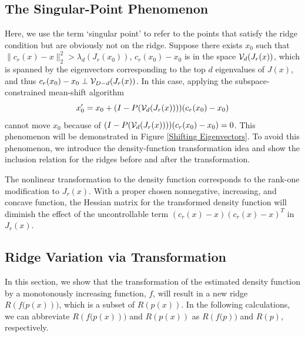 \documentclass[aos,preprint]{imsart}
\theoremstyle{remark}
\begin{document}
\subsection{The Singular-Point Phenomenon}
Here, we use the term `singular point' to refer to the points that satisfy the ridge condition but are obviously not on the ridge.
Suppose there exists $x_0$ such that $\|c_r(x)-x\|_2^2>\lambda_d(J_r(x_0))$, $c_r(x_0)-x_0$ is in the space ${\cal V}_d(J_r(x))$, which is spanned by the eigenvectors corresponding to the top $d$ eigenvalues of $J(x)$, and thus $c_r(x_0)-x_0\perp {\cal V}_{D-d}(J_r(x))$. In this case, applying the subspace-constrained mean-shift algorithm 
\[
x_0' = x_0+ (I-P({\cal V}_d(J_r(x)))) (c_r(x_0)-x_0)
\] 
cannot move $x_0$ because of $(I- P({\cal V}_d(J_r(x)))) (c_r(x_0)-x_0)=0$. This phenomenon will be demonstrated in Figure \ref{Shifting Eigenvectors}. To avoid this phenomenon, we introduce the density-function transformation idea and show the inclusion relation for the ridges before and after the transformation.

The nonlinear transformation to the density function corresponds to the rank-one modification to $J_r(x)$. With a proper chosen nonnegative, increasing, and concave function, the Hessian matrix for the transformed density function will diminish the effect of the uncontrollable term $(c_r(x)-x)(c_r(x)-x)^T$ in $J_r(x)$.
\subsection{Ridge Variation via Transformation}
In this section, we show that the transformation of the estimated density function by a monotonously increasing function, $f$, will result in a new ridge $R({f(p}(x)))$, which is a subset of $R({p}(x))$. In the following calculations, we can abbreviate $R({f(p}(x)))$ and $R({p}(x))$ as $R({f(p}))$ and $R({p})$, respectively.
\end{document}
